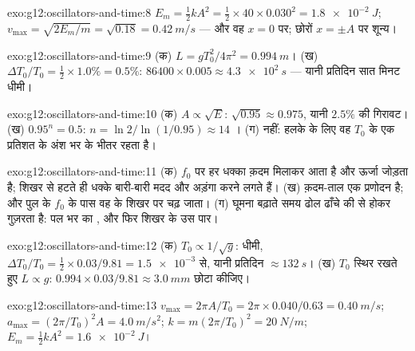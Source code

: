 \begin{solution}{exo:g12:oscillators-and-time:8}
$E_m = \tfrac12 kA^2 = \tfrac12 \times 40 \times 0.030^2 =
\qty{1.8e-2}{J}$; $v_{\max} = \sqrt{2E_m/m} = \sqrt{0.18} =
\qty{0.42}{m/s}$ --- और वह $x = 0$ पर; छोरों $x = \pm A$ पर शून्य।
\end{solution}

\begin{solution}{exo:g12:oscillators-and-time:9}
(क) $L = gT_0^2/4\pi^2 = \qty{0.994}{m}$। (ख) $\Delta T_0/T_0 =
\tfrac12 \times 1.0\% = 0.5\%$: $86400 \times 0.005 \approx
\qty{4.3e2}{s}$ --- यानी प्रतिदिन सात मिनट धीमी।
\end{solution}

\begin{solution}{exo:g12:oscillators-and-time:10}
(क) $A \propto \sqrt{E}$: $\sqrt{0.95} \approx 0.975$, यानी $2.5\%$ की गिरावट। (ख) $0.95^n = 0.5$: $n = \ln 2/\ln(1/0.95) \approx 14$ ।
(ग) नहीं: हलके  के लिए वह $T_0$ के एक प्रतिशत के अंश भर के
भीतर रहता है।
\end{solution}

\begin{solution}{exo:g12:oscillators-and-time:11}
(क) $f_0$ पर हर धक्का क़दम मिलाकर आता है और ऊर्जा जोड़ता है; शिखर से
हटते ही धक्के बारी-बारी मदद और अड़ंगा करने लगते हैं। (ख) क़दम-ताल एक
 प्रणोदन है; और पुल के $f_0$ के पास वह  के शिखर
पर चढ़ जाता। (ग) घूमना बढ़ाते समय ढोल ढाँचे की  से
होकर गुज़रता है: पल भर का , और फिर शिखर के उस पार।
\end{solution}

\begin{solution}{exo:g12:oscillators-and-time:12}
(क) $T_0 \propto 1/\sqrt{g}$: धीमी, $\Delta T_0/T_0 = \tfrac12
\times 0.03/9.81 = \num{1.5e-3}$ से, यानी प्रतिदिन $\approx \qty{132}{s}$। (ख) $T_0$ स्थिर रखते हुए
$L \propto g$: $0.994 \times
0.03/9.81 \approx \qty{3.0}{mm}$ छोटा कीजिए।
\end{solution}

\begin{solution}{exo:g12:oscillators-and-time:13}
$v_{\max} = 2\pi A/T_0 = 2\pi \times 0.040/0.63 = \qty{0.40}{m/s}$; $a_{\max} = (2\pi/T_0)^2 A = \qty{4.0}{m/s^2}$; $k = m(2\pi/T_0)^2
= \qty{20}{N/m}$; $E_m = \tfrac12 kA^2 = \qty{1.6e-2}{J}$।
\end{solution}

